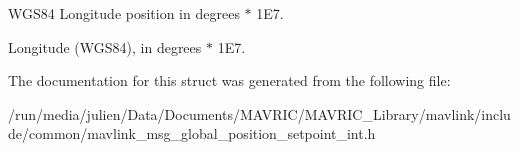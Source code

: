 W\+G\+S84 Longitude position in degrees $\ast$ 1\+E7. 

Longitude (W\+G\+S84), in degrees $\ast$ 1\+E7. 

The documentation for this struct was generated from the following file\+:\begin{DoxyCompactItemize}
\item 
/run/media/julien/\+Data/\+Documents/\+M\+A\+V\+R\+I\+C/\+M\+A\+V\+R\+I\+C\+\_\+\+Library/mavlink/include/common/mavlink\+\_\+msg\+\_\+global\+\_\+position\+\_\+setpoint\+\_\+int.\+h\end{DoxyCompactItemize}
